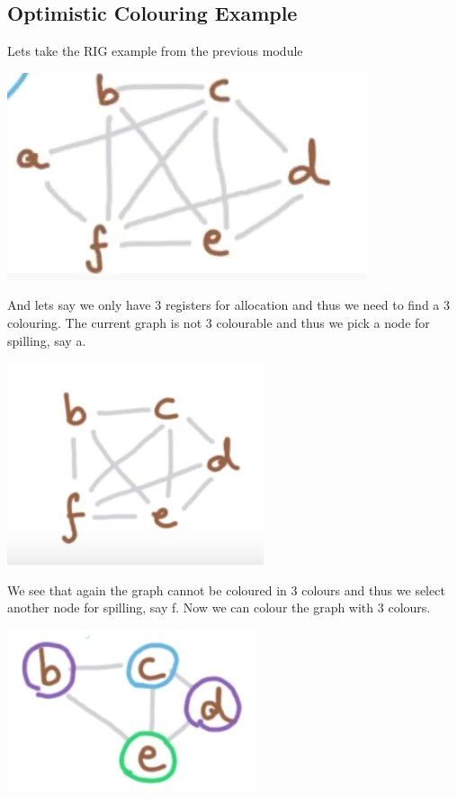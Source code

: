 \subsection{Optimistic Colouring Example}
Lets take the RIG example from the previous module
\begin{center}
    \includegraphics[scale=0.30]{images/85_RIGeg2.png}
\end{center}
And lets say we only have 3 registers for allocation and thus we need to find a 3 colouring. The current graph is not 3 colourable and thus we pick a node for spilling, say a.
\begin{center}
    \includegraphics[scale=0.30]{images/86_remove_a.png}
\end{center}
We see that again the graph cannot be coloured in 3 colours and thus we select another node for spilling, say f. Now we can colour the graph with 3 colours.
\begin{center}
    \includegraphics[scale=0.30]{images/86_color_RIG.png}
\end{center}
